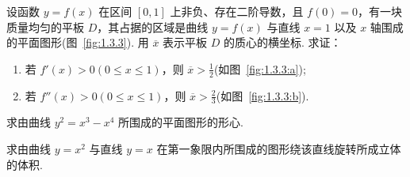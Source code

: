 	\begin{ti}
		设函数 $y = f(x)$ 在区间 $[0,1]$ 上非负、存在二阶导数，且 $f(0) = 0$，有一块质量均匀的平板 $D$，其占据的区域是曲线 $y = f(x)$ 与直线 $x = 1$ 以及 $x$ 轴围成的平面图形(图~\ref{fig:1.3.3}). 用 $\overline{x}$ 表示平板 $D$ 的质心的横坐标. 求证：
		\begin{enumerate}
			\item 若 $f'(x) > 0(0 \leq x \leq 1)$，则 $\overline{x} > \frac{1}{2}$(如图~\ref{fig:1.3.3:a});
			\item 若 $f''(x) > 0(0 \leq x \leq 1)$，则 $\overline{x} > \frac{2}{3}$(如图~\ref{fig:1.3.3:b}).
		\end{enumerate}
		\begin{figure}[htbp]
			\begin{floatrow}
			\end{floatrow}
		  \end{figure}
	\end{ti}

	\begin{ti}
		求由曲线 $y^{2} = x^{3} - x^{4}$ 所围成的平面图形的形心.
	\end{ti}

	\begin{ti}
		求由曲线 $y = x^{2}$ 与直线 $y = x$ 在第一象限内所围成的图形绕该直线旋转所成立体的体积.
	\end{ti}